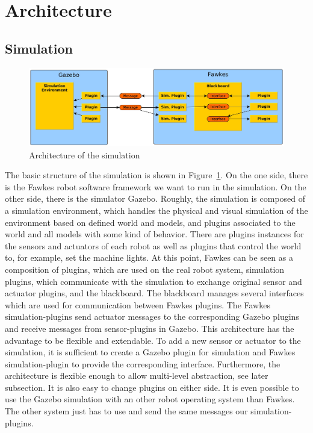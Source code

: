 \section{Architecture}

\subsection{Simulation}
\begin{figure}
\includegraphics[width=\textwidth]{tabs/fawkes_gazebo}
\caption{Architecture of the simulation}
\label{fig:fawkes_gazebo}
\end{figure}
The basic structure of the simulation is shown in Figure~\ref{fig:fawkes_gazebo}. On the one side, there is the Fawkes robot software framework we want to run in the simulation. On the other side, there is the simulator Gazebo. Roughly, the simulation is composed of a simulation environment, which handles the physical and visual simulation of the environment based on defined world and models, and plugins associated to the world and all models with some kind of behavior. There are plugins instances for the sensors and actuators of each robot as well as plugins that control the world to, for example, set the machine lights. At this point, Fawkes can be seen as a composition of plugins, which are used on the real robot system, simulation plugins, which communicate with the simulation to exchange original sensor and actuator plugins, and the blackboard. The blackboard manages several interfaces which are used for communication between Fawkes plugins. The Fawkes simulation-plugins send actuator messages to the corresponding Gazebo plugins and receive messages from sensor-plugins in Gazebo. This architecture has the advantage to be flexible and extendable. To add a new sensor or actuator to the simulation, it is sufficient to create a Gazebo plugin for simulation and Fawkes simulation-plugin to provide the corresponding interface. Furthermore, the architecture is flexible enough to allow multi-level abstraction, see later subsection. It is also easy to change plugins on either side. It is even possible to use the Gazebo simulation with an other robot operating system than Fawkes. The other system just has to use and send the same messages our simulation-plugins.


